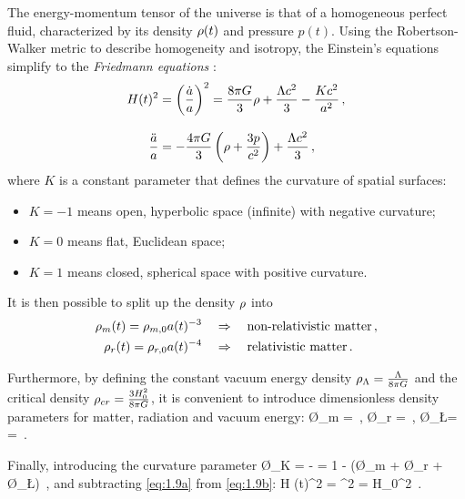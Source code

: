The energy-momentum tensor of the universe is that of a homogeneous perfect fluid, characterized by its density $\rho (t)$ and pressure $p (t)$. Using the Robertson-Walker metric to describe homogeneity and isotropy, the Einstein's equations simplify to the \emph{Friedmann equations} \citep{friedman_uber_1922,friedmann_uber_1924}:
\begin{subequations}
\begin{align}
    \label{eq:1.9a}
    H (t)^2 &= \left( \frac{\dot{a}}{a} \right)^2 = \frac{8 \pi G}{3} \rho + \frac{\Lambda c^2}{3} - \frac{K c^2}{a^2} \,,
    \\[2ex]
    \label{eq:1.9b}
    \frac{\ddot{a}}{a} &= - \frac{4 \pi G}{3} \left( \rho + \frac{3 p}{c^2} \right) + \frac{\Lambda c^2}{3} \,,
\end{align}
\end{subequations}
where $K$ is a constant parameter that defines the curvature of spatial surfaces:
\begin{itemize}
    \item $K = -1$ means open, hyperbolic space (\ie infinite) with negative curvature;
    \item $K = 0$ means flat, Euclidean space;
    \item $K = 1$ means closed, spherical space with positive curvature.
\end{itemize}

It is then possible to split up the density $\rho$ into
\begin{subequations}
\begin{align}
    \label{eq:1.10a}
    \rho_m (t) = \rho_{m,0} a(t)^{-3} \quad &\Rightarrow \quad \textrm{non-relativistic matter} \,,
    \\
    \label{eq:1.10b}
    \rho_r (t) = \rho_{r,0} a(t)^{-4} \quad &\Rightarrow \quad \textrm{relativistic matter} \,.
\end{align}
\end{subequations}

Furthermore, by defining the constant vacuum energy density $\rho_\Lambda = \frac{\Lambda}{8 \pi G}$ and the critical density $\rho_{cr} = \frac{3 H_0^2}{8 \pi G}$, it is convenient to introduce dimensionless density parameters for matter, radiation and vacuum energy:
\be
\label{eq:1.11}
\O_m =  \,, \quad\quad\quad \O_r =  \,, \quad\quad\quad \O_\L =  =  \,.
\ee

Finally, introducing the curvature parameter
\be
\label{eq:1.12}
\O_K = -  = 1 - (\O_m + \O_r + \O_\L) \,,
\ee
and subtracting \cref{eq:1.9a} from \cref{eq:1.9b}:
\be
\label{eq:1.13}
 H (t)^2 = ^2 = H_0^2  \,.
\ee

